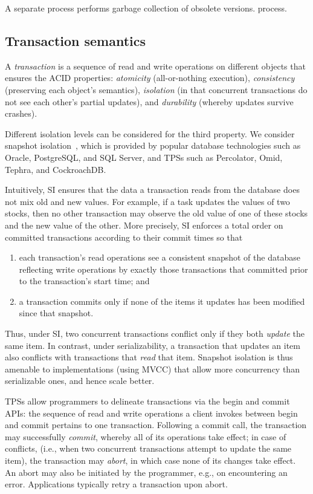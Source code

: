 A separate process performs garbage collection of obsolete versions.
process.

\subsection{Transaction semantics} \label{ssec:transactions}

A \emph{transaction} is a sequence of read and write operations on different objects that ensures the ACID properties:
\emph{atomicity} (all-or-nothing execution), \emph{consistency} (preserving each object's semantics), 
\emph{isolation} (in that concurrent transactions do not see each other's partial updates), and 
\emph{durability} (whereby updates survive crashes).

Different isolation levels can be considered for the third property. We consider 
snapshot isolation~\cite{DBLP:conf/sigmod/BerensonBGMOO95}, 
which is provided by popular database technologies such as Oracle, PostgreSQL, and SQL Server,
and TPSs such as Percolator, Omid, Tephra, and  CockroachDB.

Intuitively, SI ensures that the data a transaction reads from the database 
does not mix old and new values. For example, if a task updates the values of two stocks, then no other transaction may observe the old value of one of these stocks and the new value of the other. 
%
More precisely, SI enforces a total order on committed transactions according to their commit times so that 
\begin{enumerate}
    \setlength{\itemsep}{0pt}
    \setlength{\parskip}{0pt}
    \setlength{\parsep}{2pt}  
\item
each transaction's read operations see a consistent snapshot of the database reflecting write operations by
 exactly those transactions that committed prior to the transaction's start time; and 
\item
 a transaction commits only if none of the items it updates has been modified since that snapshot.
 \end{enumerate}
Thus, under SI, two concurrent transactions conflict only if they both \emph{update} the same item.  
In contrast, under serializability, a transaction that updates an item also conflicts with transactions that \emph{read} that item. Snapshot isolation is thus amenable to implementations (using MVCC) that 
allow more concurrency than serializable ones, and hence scale better.

TPSs allow programmers to  delineate transactions via the begin and commit APIs: 
the sequence of read and write operations a client invokes between begin and  commit pertains to one transaction.
Following a commit call, the transaction may successfully \emph{commit}, whereby all of its operations take effect;
in case of conflicts, (i.e., when two concurrent transactions attempt to update the same item), the transaction may
\emph{abort}, in which case none of its changes take effect. An abort may also be initiated by the programmer, e.g., 
on encountering an error. Applications typically retry a transaction upon  abort. 



